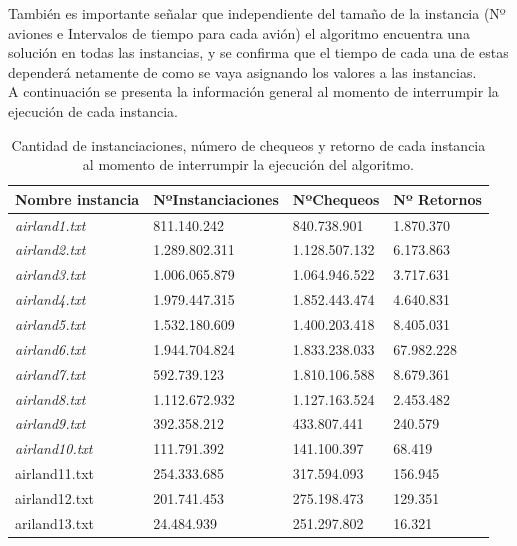 \documentclass[letter, 10pt]{article}
\begin{document}
También es importante señalar que independiente del tamaño de la instancia (Nº aviones e Intervalos de tiempo para cada avión) el algoritmo encuentra una solución en todas las instancias, y se confirma que el tiempo de cada una de estas dependerá netamente de como se vaya asignando los valores a las instancias.\\

A continuación se presenta la información general al momento de interrumpir la ejecución de cada instancia.\\
    \begin{table}[h]
    \centering
    \begin{tabular}{|l|l|l|l|}
    \hline
    \textbf{Nombre instancia} & \textbf{NºInstanciaciones} & \textbf{NºChequeos} & \textbf{Nº Retornos} \\ \hline
    \textit{airland1.txt}     &     811.140.242                       &      840.738.901                &           1.870.370            \\ \hline
    \textit{airland2.txt}     & 1.289.802.311                 & 1.128.507.132          & 6.173.863              \\ \hline
    \textit{airland3.txt}     & 1.006.065.879                 & 1.064.946.522          & 3.717.631              \\ \hline
    \textit{airland4.txt}     & 1.979.447.315                 & 1.852.443.474          & 4.640.831              \\ \hline
    \textit{airland5.txt}     & 1.532.180.609                 & 1.400.203.418          & 8.405.031              \\ \hline
    \textit{airland6.txt}     & 1.944.704.824                 & 1.833.238.033          & 67.982.228             \\ \hline
    \textit{airland7.txt}     & 592.739.123                  & 1.810.106.588          & 8.679.361              \\ \hline
    \textit{airland8.txt}     & 1.112.672.932                 & 1.127.163.524          & 2.453.482              \\ \hline
    \textit{airland9.txt}     & 392.358.212                  & 433.807.441           & 240.579               \\ \hline
    \textit{airland10.txt}    & 111.791.392                  & 141.100.397           & 68.419                \\ \hline
    airland11.txt             & 254.333.685                  & 317.594.093           & 156.945               \\ \hline
    airland12.txt             & 201.741.453                  & 275.198.473           & 129.351               \\ \hline
    ariland13.txt             & 24.484.939                   & 251.297.802           & 16.321                \\ \hline
    \end{tabular}
    \caption{Cantidad de instanciaciones, número de chequeos y retorno de cada instancia al momento de interrumpir la ejecución del algoritmo.}
    \end{table}
\end{document}
